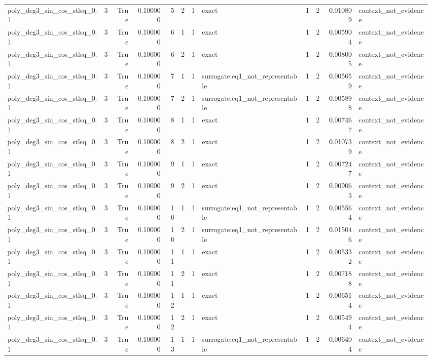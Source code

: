 \begin{tabular}{lrrrrrrlrrrl}
poly\_deg3\_sin\_cos\_stlsq\_0.1 & 3 & True & 0.100000 & 5 & 2 & 1 & exact & 1 & 2 & 0.010809 & context\_not\_evidence \\
poly\_deg3\_sin\_cos\_stlsq\_0.1 & 3 & True & 0.100000 & 6 & 1 & 1 & exact & 1 & 2 & 0.005904 & context\_not\_evidence \\
poly\_deg3\_sin\_cos\_stlsq\_0.1 & 3 & True & 0.100000 & 6 & 2 & 1 & exact & 1 & 2 & 0.008005 & context\_not\_evidence \\
poly\_deg3\_sin\_cos\_stlsq\_0.1 & 3 & True & 0.100000 & 7 & 1 & 1 & surrogate:eq1\_not\_representable & 1 & 2 & 0.005659 & context\_not\_evidence \\
poly\_deg3\_sin\_cos\_stlsq\_0.1 & 3 & True & 0.100000 & 7 & 2 & 1 & surrogate:eq1\_not\_representable & 1 & 2 & 0.005898 & context\_not\_evidence \\
poly\_deg3\_sin\_cos\_stlsq\_0.1 & 3 & True & 0.100000 & 8 & 1 & 1 & exact & 1 & 2 & 0.007467 & context\_not\_evidence \\
poly\_deg3\_sin\_cos\_stlsq\_0.1 & 3 & True & 0.100000 & 8 & 2 & 1 & exact & 1 & 2 & 0.010739 & context\_not\_evidence \\
poly\_deg3\_sin\_cos\_stlsq\_0.1 & 3 & True & 0.100000 & 9 & 1 & 1 & exact & 1 & 2 & 0.007247 & context\_not\_evidence \\
poly\_deg3\_sin\_cos\_stlsq\_0.1 & 3 & True & 0.100000 & 9 & 2 & 1 & exact & 1 & 2 & 0.009063 & context\_not\_evidence \\
poly\_deg3\_sin\_cos\_stlsq\_0.1 & 3 & True & 0.100000 & 10 & 1 & 1 & surrogate:eq1\_not\_representable & 1 & 2 & 0.005564 & context\_not\_evidence \\
poly\_deg3\_sin\_cos\_stlsq\_0.1 & 3 & True & 0.100000 & 10 & 2 & 1 & surrogate:eq1\_not\_representable & 1 & 2 & 0.015046 & context\_not\_evidence \\
poly\_deg3\_sin\_cos\_stlsq\_0.1 & 3 & True & 0.100000 & 11 & 1 & 1 & exact & 1 & 2 & 0.005332 & context\_not\_evidence \\
poly\_deg3\_sin\_cos\_stlsq\_0.1 & 3 & True & 0.100000 & 11 & 2 & 1 & exact & 1 & 2 & 0.007188 & context\_not\_evidence \\
poly\_deg3\_sin\_cos\_stlsq\_0.1 & 3 & True & 0.100000 & 12 & 1 & 1 & exact & 1 & 2 & 0.006514 & context\_not\_evidence \\
poly\_deg3\_sin\_cos\_stlsq\_0.1 & 3 & True & 0.100000 & 12 & 2 & 1 & exact & 1 & 2 & 0.005494 & context\_not\_evidence \\
poly\_deg3\_sin\_cos\_stlsq\_0.1 & 3 & True & 0.100000 & 13 & 1 & 1 & surrogate:eq1\_not\_representable & 1 & 2 & 0.006404 & context\_not\_evidence \\

\end{tabular}
